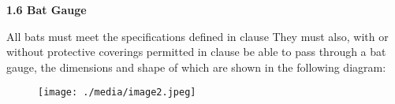 \documentclass[12pt]{article}
\begin{document}
\vspace{\baselineskip}
{\fontsize{11pt}{13.2pt}\selectfont \textbf{1.6 \tabto{0.47in} Bat Gauge}\par}\par


\vspace{\baselineskip}
\begin{adjustwidth}{0.49in}{0.08in}
{\fontsize{9pt}{10.8pt}\selectfont All bats must meet the specifications defined in clause They must also, with or without protective coverings permitted in clause be able to pass through a bat gauge, the dimensions and shape of which are shown in the following diagram:\par}\par

\end{adjustwidth}




\begin{figure}[H]
\advance\leftskip 0.62in		\texttt{[image: ./media/image2.jpeg]}
\end{figure}



\par


\vspace{\baselineskip}

\vspace{\baselineskip}

\vspace{\baselineskip}

\vspace{\baselineskip}

\vspace{\baselineskip}

\vspace{\baselineskip}

\vspace{\baselineskip}

\vspace{\baselineskip}

\vspace{\baselineskip}

\vspace{\baselineskip}

\vspace{\baselineskip}
\end{document}
